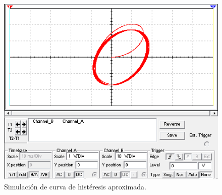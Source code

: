 \documentclass[twocolumn]{IEEEtran}
\begin{document}
\begin{figure}[H]
	\centering
		\includegraphics[scale=0.5]{sim1.PNG}
	\caption{Simulación de curva de histéresis aproximada.}
	\label{fig15}
\end{figure}
\end{document}
